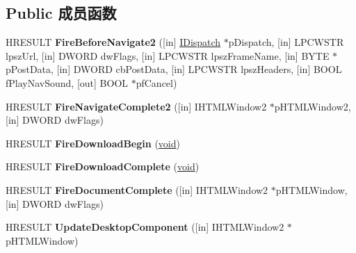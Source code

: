 \subsection*{Public 成员函数}
\begin{DoxyCompactItemize}
\item 
\mbox{\label{interface_i_doc_object_service_a7233cd7e49f6c11ca0220f26bce8ec47}} 
H\+R\+E\+S\+U\+LT {\bfseries Fire\+Before\+Navigate2} (\mbox{[}in\mbox{]} \hyperlink{interface_i_dispatch}{I\+Dispatch} $\ast$p\+Dispatch, \mbox{[}in\mbox{]} L\+P\+C\+W\+S\+TR lpsz\+Url, \mbox{[}in\mbox{]} D\+W\+O\+RD dw\+Flags, \mbox{[}in\mbox{]} L\+P\+C\+W\+S\+TR lpsz\+Frame\+Name, \mbox{[}in\mbox{]} B\+Y\+TE $\ast$p\+Post\+Data, \mbox{[}in\mbox{]} D\+W\+O\+RD cb\+Post\+Data, \mbox{[}in\mbox{]} L\+P\+C\+W\+S\+TR lpsz\+Headers, \mbox{[}in\mbox{]} B\+O\+OL f\+Play\+Nav\+Sound, \mbox{[}out\mbox{]} B\+O\+OL $\ast$pf\+Cancel)
\item 
\mbox{\label{interface_i_doc_object_service_a7950c8d28bec7b5cd18a44b2057e4c44}} 
H\+R\+E\+S\+U\+LT {\bfseries Fire\+Navigate\+Complete2} (\mbox{[}in\mbox{]} I\+H\+T\+M\+L\+Window2 $\ast$p\+H\+T\+M\+L\+Window2, \mbox{[}in\mbox{]} D\+W\+O\+RD dw\+Flags)
\item 
\mbox{\label{interface_i_doc_object_service_a7138bf25a8e866b458b4b48a49098696}} 
H\+R\+E\+S\+U\+LT {\bfseries Fire\+Download\+Begin} (\hyperlink{interfacevoid}{void})
\item 
\mbox{\label{interface_i_doc_object_service_a1fcdd3d881a02a3ced5f4917ccbb3a5d}} 
H\+R\+E\+S\+U\+LT {\bfseries Fire\+Download\+Complete} (\hyperlink{interfacevoid}{void})
\item 
\mbox{\label{interface_i_doc_object_service_a887e637032192c529c5c448e0fa13652}} 
H\+R\+E\+S\+U\+LT {\bfseries Fire\+Document\+Complete} (\mbox{[}in\mbox{]} I\+H\+T\+M\+L\+Window2 $\ast$p\+H\+T\+M\+L\+Window, \mbox{[}in\mbox{]} D\+W\+O\+RD dw\+Flags)
\item 
\mbox{\label{interface_i_doc_object_service_af3973d030ac1237c25d8638a6c78e108}} 
H\+R\+E\+S\+U\+LT {\bfseries Update\+Desktop\+Component} (\mbox{[}in\mbox{]} I\+H\+T\+M\+L\+Window2 $\ast$p\+H\+T\+M\+L\+Window)

\end{DoxyCompactItemize}
